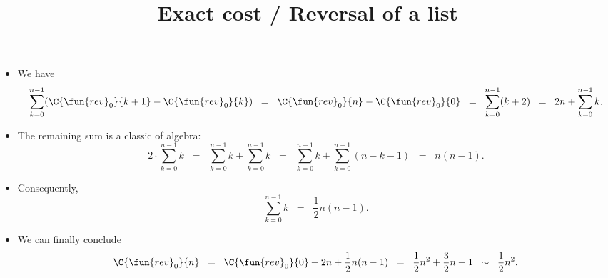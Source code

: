 \documentclass[wide]{slides}
\begin{document}
\begin{slide}
  \title{Exact cost / Reversal of a list}

  \begin{itemize}

    \item We have
      \begin{equation*}
        \sum_{k=0}^{n-1}(\C{\fun{rev}_0}{k+1} - \C{\fun{rev}_0}{k})
        \;\; = \;\;
        \C{\fun{rev}_0}{n} - \C{\fun{rev}_0}{0} \;\; = \;\;
        \sum_{k=0}^{n-1}(k+2) \;\; = \;\; 2n + \sum_{k=0}^{n-1}{k}.
      \end{equation*}

    \item The remaining sum is a classic of algebra:
      \begin{equation*}
        2 \cdot \sum_{k=0}^{n-1}{k} \;\; = \;\;
        \sum_{k=0}^{n-1}{k} + \sum_{k=0}^{n-1}{k} \;\; = \;\;
        \sum_{k=0}^{n-1}{k} + \sum_{k=0}^{n-1}(n-k-1) \;\; = \;\; n(n-1).
      \end{equation*}

    \item Consequently,
      \begin{equation*}
        \sum_{k=0}^{n-1}{k} \;\; = \;\; \frac{1}{2} n(n-1).
      \end{equation*}

    \item We can finally conclude
      \begin{equation*}
        \C{\fun{rev}_0}{n} \;\; = \;\; \C{\fun{rev}_0}{0} + 2n +
        \frac{1}{2} n(n-1)
        \;\; = \;\; \frac{1}{2}n^2 + \frac{3}{2}n + 1
        \;\; \sim \;\; \frac{1}{2}n^2.
      \end{equation*}

  \end{itemize}

\end{slide}
\end{document}
